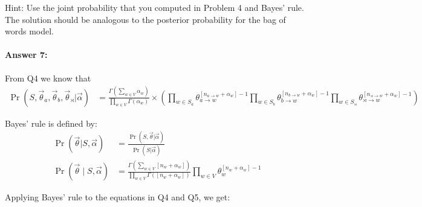 \documentclass[10pt]{article}
\begin{document}
\noindent Hint: Use the joint probability that you computed in Problem
4 and Bayes' rule. The solution should be analogous to the posterior
probability for the bag of words model.

\paragraph{Answer 7:}

From Q4 we know that \\
\begin{equation*}
\begin{aligned}
\Pr(S, \vec{\theta}_{a}, \vec{\theta}_{b}, \vec{\theta}_{\rtimes} |
\vec{\alpha}) 
&= {\frac {\Gamma
\left(\sum_{w \in V}\alpha _{w}\right)}{\prod _{w \in V} \Gamma (\alpha _{w})}} \times 
(\prod_{w\in S_a}
{\theta}_{a \rightarrow w}^{[n_{a \rightarrow w}+\alpha_w]-1} \prod_{w\in S_b}
{\theta}_{b \rightarrow w}^{[n_{b \rightarrow w}+\alpha_w]-1}
\prod_{w\in S_\rtimes}
{\theta}_{\rtimes \rightarrow w}^{[n_{\rtimes \rightarrow w}+\alpha_w]-1})
\end{aligned}
\end{equation*}

Bayes' rule is defined by:
\begin{equation*}
\begin{aligned}
\Pr(\vec{\theta} | S, \vec{\alpha}) 
&= {\frac{\Pr(S, \vec{\theta} | \vec{\alpha})}{\Pr(S|\vec{\alpha})}}
\\
\Pr(\vec{\theta}\mid S, \vec{\alpha}) &= {\frac {\Gamma
\left(\sum_{w \in
V}[n_{w}+\alpha _{w}]\right)}{\prod _{w \in V}
\Gamma ([n_{w}+\alpha _{w}])}}\prod_{w \in
V}\theta_{w}^{[n_{w}+\alpha _{w}]-1}
\end{aligned}
\end{equation*}

Applying Bayes' rule to the equations in Q4 and Q5, we get:
\end{document}
